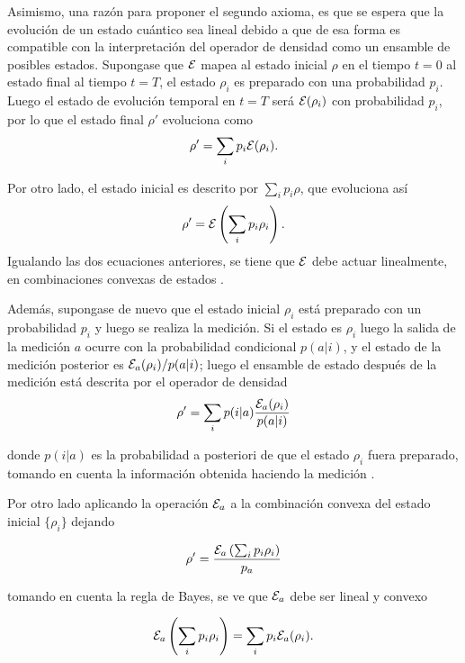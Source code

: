 Asimismo, una razón para proponer el segundo axioma, es que se espera que la evolución de un estado cuántico sea lineal debido a que de esa forma es compatible con la interpretación del operador de densidad como un ensamble de posibles estados. Supongase que $\mathcal{E}$ mapea al estado inicial $\rho$  en el tiempo $t=0$ al estado final al tiempo $t=T$, el estado $\rho_i$ es preparado con una probabilidad $p_i$. Luego el estado de evolución temporal en $t = T$ será $\mathcal{E}(\rho_i )$ con probabilidad $p_i$, por lo que el estado final $\rho'$ evoluciona como 
\begin{equation}
\rho'= \sum_i p_i \mathcal{E} (\rho_i).
\end{equation}

Por otro lado, el estado inicial es descrito por $\sum_i p_i \rho$, que evoluciona así 
\begin{equation}
    \rho'= \mathcal{E}\left(\sum_i p_i \rho_i\right).
\end{equation}
Igualando las dos ecuaciones anteriores, se tiene  que $\mathcal{E}$ debe actuar linealmente,  en combinaciones convexas de estados {\cite{preskill2020quantum}}.


Además, supongase de nuevo que el estado inicial $\rho_i$ está preparado con un probabilidad $p_i$ y luego se realiza la medición. Si el estado es $\rho_i $ luego la salida de la medición  $a$ ocurre con la probabilidad condicional $p(a|i)$, y el estado de la medición  posterior es $\mathcal{E}_a(\rho_i)/p(a|i)$; luego el ensamble de estado después de la medición está descrita por el operador de densidad 
\begin{equation}
    \rho'=\sum_i p(i|a)\dfrac{\mathcal{E}_a(\rho_i)}{p(a|i)}
\end{equation}

donde $p(i|a)$ es la probabilidad a posteriori de que el estado $\rho_i$ fuera preparado, tomando en cuenta la información obtenida haciendo la medición {\cite{preskill2020quantum}}. 

Por otro lado aplicando la operación $\mathcal{E}_a$  a la combinación convexa del estado inicial $\{\rho_i\}$ dejando 

\begin{equation}
    \rho'=\dfrac{\mathcal{E}_a\left(\sum_i p_i \rho_i\right)}{p_a}
\end{equation}

tomando en cuenta la regla de Bayes, se ve que $\mathcal{E}_a$ debe ser lineal y convexo {\cite{preskill2020quantum}}

\begin{equation}
    \mathcal{E}_a\left(\sum_i p_i \rho_i\right)=\sum_i p_i\mathcal{E}_a(\rho_i). 
\end{equation}

